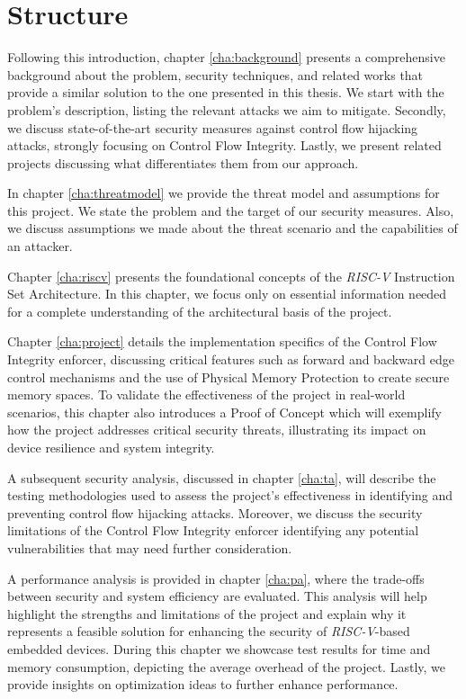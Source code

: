 \section{Structure}
\label{sec:intro_structure}

Following this introduction, chapter \ref{cha:background} presents a
comprehensive background about the problem, security techniques, and related
works that provide a similar solution to the one presented in this thesis. We start
with the problem's description, listing the relevant attacks we aim to mitigate.
Secondly, we discuss state-of-the-art security measures against control flow
hijacking attacks, strongly focusing on Control Flow Integrity. Lastly, we present
related projects discussing what differentiates them from our approach.

In chapter \ref{cha:threatmodel} we provide the threat model and assumptions for
this project. We state the problem and the target of our security measures. Also,
we discuss assumptions we made about the threat scenario and the capabilities of
an attacker.

Chapter \ref{cha:riscv} presents the foundational concepts of the \textit{RISC-V}
Instruction Set Architecture. In this chapter, we focus only on essential information
needed for a complete understanding of the architectural basis of the project.

Chapter \ref{cha:project} details the implementation specifics of the Control Flow
Integrity enforcer, discussing critical features such as forward and backward
edge control mechanisms and the use of Physical Memory Protection to create
secure memory spaces. To validate the effectiveness of the project in real-world
scenarios, this chapter also introduces a Proof of Concept which will exemplify
how the project addresses critical security threats, illustrating its impact on device
resilience and system integrity.

A subsequent security analysis, discussed in chapter \ref{cha:ta}, will describe
the testing methodologies used to assess the project's effectiveness in identifying
and preventing control flow hijacking attacks. Moreover, we discuss the security
limitations of the Control Flow Integrity enforcer identifying any potential vulnerabilities
that may need further consideration.

A performance analysis is provided in chapter \ref{cha:pa}, where the trade-offs
between security and system efficiency are evaluated. This analysis will help highlight
the strengths and limitations of the project and explain why it represents a feasible
solution for enhancing the security of \textit{RISC-V}-based embedded devices. During
this chapter we showcase test results for time and memory consumption, depicting
the average overhead of the project. Lastly, we provide insights on optimization
ideas to further enhance performance.

